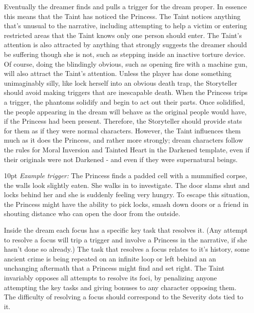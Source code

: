 Eventually the dreamer finds and pulls a trigger for the dream proper. In essence this means that the Taint has noticed the Princess. The Taint notices anything that's unusual to the narrative, including attempting to help a victim or entering restricted areas that the Taint knows only one person should enter. The Taint's attention is also attracted by anything that strongly suggests the dreamer should be suffering though she is not, such as stepping inside an inactive torture device. Of course, doing the blindingly obvious, such as opening fire with a machine gun, will also attract the Taint's attention. Unless the player has done something unimaginably silly, like lock herself into an obvious death trap, the Storyteller should avoid making triggers that are inescapable death. When the Princess trips a trigger, the phantoms solidify and begin to act out their parts. Once solidified, the people appearing in the dream will behave as the original people would have, if the Princess had been present. Therefore, 
the Storyteller should provide stats for them as if they were normal characters. However, the Taint influences them much as it does the Princess, and rather more strongly; dream characters follow the rules for Moral Inversion and Tainted Heart in the Darkened template, even if their originals were not Darkened - and even if they were supernatural beings.

\begin{myindentpar}{10pt}    \emph{Example trigger:} The Princess finds a padded cell with a mummified corpse, the walls look slightly eaten. She walks in to investigate. The door slams shut and locks behind her and she is suddenly feeling very hungry. To escape this situation, the Princess might have the ability to pick locks, smash down doors or a friend in shouting distance who can open the door from the outside.\end{myindentpar}

\noindent Inside the dream each focus has a specific key task that resolves it. (Any attempt to resolve a focus will trip a trigger and involve a Princess in the narrative, if she hasn't done so already.) The task that resolves a focus relates to it's history, some ancient crime is being repeated on an infinite loop or left behind an an unchanging aftermath that a Princess might find and set right. The Taint invariably opposes all attempts to resolve its foci, by penalizing anyone attempting the key tasks and giving bonuses to any character opposing them. The difficulty of resolving a focus should correspond to the Severity dots tied to it.

